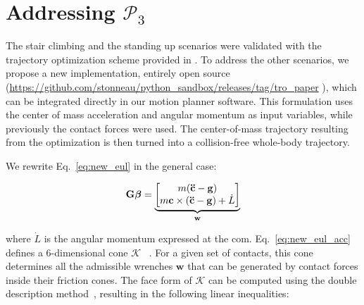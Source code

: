 \section{Addressing $\mathcal{P}_3$}
\label{app:optim}
The stair climbing and the standing up scenarios were validated with the trajectory optimization scheme provided in \citeauthor{Carpentier2016}. 
To address the other scenarios, we propose a new implementation, entirely open source (\url{https://github.com/stonneau/python_sandbox/releases/tag/tro_paper} ), which can be integrated directly in our motion planner software. This formulation uses the center of mass acceleration and angular momentum as input variables, while previously the contact forces were used.
The center-of-mass trajectory resulting from the optimization is then turned into a collision-free whole-body trajectory.

We rewrite Eq.~\ref{eq:new_eul} in the general case:


\begin{align} \label{eq:new_eul_acc}
\mathbf{G} \bm{\beta} = 
\underbrace{\mat{m (\mathbf{\ddot{c}} - \mathbf{g}) \\m \mathbf{c} \times (\mathbf{\ddot{c}} - \mathbf{g}) + \dot{L}}}_{\mathbf{w}}
\end{align}

\noindent where $\dot{L}$ is the angular momentum expressed at the com.
Eq.~\ref{eq:new_eul_acc} defines a 6-dimensional cone $\mathcal{K}$ ~\citep{qiu:dhm:2011,Caron2015}. For a given set of contacts,
this cone determines all the admissible wrenches $\mathbf{w}$ that can be generated by contact forces inside their friction cones.
The face form of $\mathcal{K}$ can be computed using the double description method~\citep{Fukuda1996}, resulting in the following linear inequalities:

